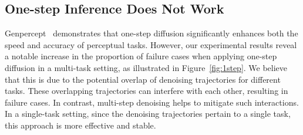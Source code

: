 \subsection{One-step Inference Does Not Work}
Genpercept~\cite{xu2024diffusion} demonstrates that one-step diffusion significantly enhances both the speed and accuracy of perceptual tasks. However, our experimental results reveal a notable increase in the proportion of failure cases when applying one-step diffusion in a multi-task setting, as illustrated in Figure~\ref{fig:1step}. We believe that this is due to the potential overlap of denoising trajectories for different tasks. These overlapping trajectories can interfere with each other, resulting in failure cases. In contrast, multi-step denoising helps to mitigate such interactions. In a single-task setting, since the denoising trajectories pertain to a single task, this approach is more effective and stable.








